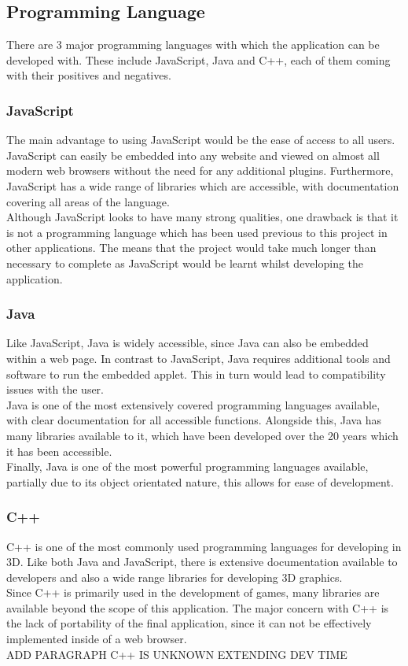 \subsection{Programming Language}
There are 3 major programming languages with which the application can be developed with. These include JavaScript, Java and C++, each of them coming with their positives and negatives.
\subsubsection{JavaScript}
The main advantage to using JavaScript would be the ease of access to all users. JavaScript can easily be embedded into any website and viewed on almost all modern web browsers without the need for any additional plugins. Furthermore, JavaScript has a wide range of libraries which are accessible, with documentation covering all areas of the language.
\vspace{5 mm}\\
Although JavaScript looks to have many strong qualities, one drawback is that it is not a programming language which has been used previous to this project in other applications. The means that the project would take much longer than necessary to complete as JavaScript would be learnt whilst developing the application.
\subsubsection{Java}
Like JavaScript, Java is widely accessible, since Java can also be embedded within a web page. In contrast to JavaScript, Java requires additional tools and software to run the embedded applet. This in turn would lead to compatibility issues with the user.
\vspace{5 mm}\\
Java is one of the most extensively covered programming languages available, with clear documentation for all accessible functions. Alongside this, Java has many libraries available to it, which have been developed over the 20 years which it has been accessible.
\vspace{5 mm}\\
Finally, Java is one of the most powerful programming languages available, partially due to its object orientated nature, this allows for ease of development.
\subsubsection{C++}
C++ is one of the most commonly used programming languages for developing in 3D. Like both Java and JavaScript, there is extensive documentation available to developers and also a wide range libraries for developing 3D graphics.
\vspace{5 mm}\\
Since C++ is primarily used in the development of games, many libraries are available beyond the scope of this application. The major concern with C++ is the lack of portability of the final application, since it can not be effectively implemented inside of a web browser.
\vspace{5 mm}\\
ADD PARAGRAPH C++ IS UNKNOWN EXTENDING DEV TIME
